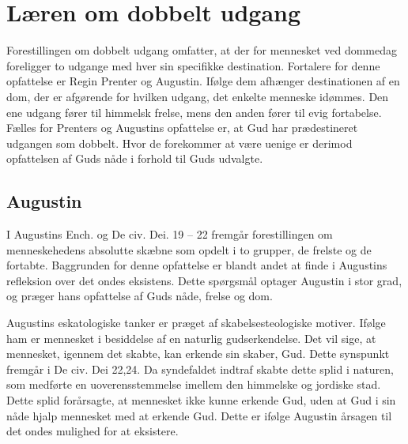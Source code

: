 \chapter{Læren om dobbelt udgang}
Forestillingen om dobbelt udgang omfatter, at der for mennesket ved dommedag foreligger to udgange med hver sin specifikke destination. Fortalere for denne opfattelse er Regin Prenter og Augustin. Ifølge dem afhænger destinationen af en dom, der er afgørende for hvilken udgang, det enkelte menneske idømmes. Den ene udgang fører til himmelsk frelse, mens den anden fører til evig fortabelse. Fælles for Prenters og Augustins opfattelse er, at Gud har prædestineret udgangen som dobbelt. Hvor de forekommer at være uenige er derimod opfattelsen af Guds nåde i forhold til Guds udvalgte.

\section{Augustin}
I Augustins Ench. og De civ. Dei. 19 – 22 fremgår forestillingen om menneskehedens absolutte skæbne som opdelt i to grupper, de frelste og de fortabte. Baggrunden for denne opfattelse er blandt andet at finde i Augustins refleksion over det ondes eksistens. Dette spørgsmål optager Augustin i stor grad, og præger hans opfattelse af Guds nåde, frelse og dom.

Augustins eskatologiske tanker er præget af skabelsesteologiske motiver. Ifølge ham er mennesket i besiddelse af en naturlig gudserkendelse. Det vil sige, at mennesket, igennem det skabte, kan erkende sin skaber, Gud. Dette synspunkt fremgår i De civ. Dei 22,24. Da syndefaldet indtraf skabte dette splid i naturen, som medførte en uoverensstemmelse imellem den himmelske og jordiske stad. Dette splid forårsagte, at mennesket ikke kunne erkende Gud, uden at Gud i sin nåde hjalp mennesket med at erkende Gud. Dette er ifølge Augustin årsagen til det ondes mulighed for at eksistere. 

